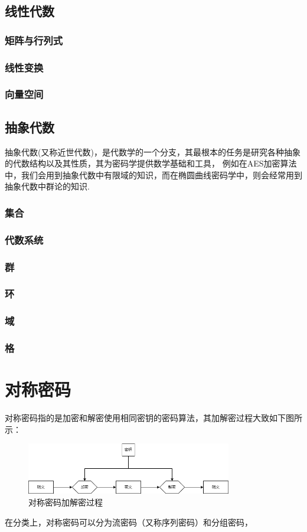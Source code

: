 \documentclass{article}
\numberwithin{equation}{subsubsection}
\begin{document}
\newpage
\subsection{线性代数}

\subsubsection{矩阵与行列式}
\subsubsection{线性变换}
\subsubsection{向量空间}

\newpage
\subsection{抽象代数}
抽象代数(又称近世代数)，是代数学的一个分支，其最根本的任务是研究各种抽象的代数结构以及其性质，其为密码学提供数学基础和工具，
例如在AES加密算法中，我们会用到抽象代数中有限域的知识，而在椭圆曲线密码学中，则会经常用到抽象代数中群论的知识.\par
\subsubsection{集合}

\subsubsection{代数系统}
\subsubsection{群}
\subsubsection{环}
\subsubsection{域}
\subsubsection{格}

\newpage
\section{对称密码}
对称密码指的是加密和解密使用相同密钥的密码算法，其加解密过程大致如下图所示：\par
\begin{figure}[h]
    \centering
    \includegraphics[width=0.8\textwidth]{Picture/Symmetric.png}
    \caption{对称密码加解密过程}
\end{figure}
在分类上，对称密码可以分为流密码（又称序列密码）和分组密码，
\end{document}
